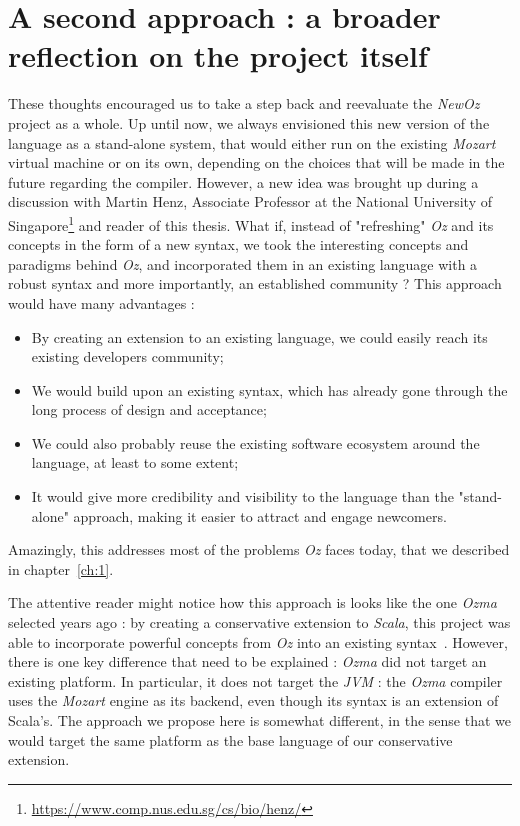 \section{A second approach : a broader reflection on the project itself}\label{sec:ch4-reflection}
These thoughts encouraged us to take a step back and reevaluate the \textit{NewOz} project as a whole.
Up until now, we always envisioned this new version of the language as a stand-alone system, that would either run on the existing \textit{Mozart} virtual machine or on its own, depending on the choices that will be made in the future regarding the compiler.
However, a new idea was brought up during a discussion with Martin Henz, Associate Professor at the National University of Singapore\footnote{\url{https://www.comp.nus.edu.sg/cs/bio/henz/}} and reader of this thesis.
What if, instead of "refreshing" \textit{Oz} and its concepts in the form of a new syntax, we took the interesting concepts and paradigms behind \textit{Oz}, and incorporated them in an existing language with a robust syntax and more importantly, an established community ?
This approach would have many advantages :
\begin{itemize}
    \item By creating an extension to an existing language, we could easily reach its existing developers community;
    \item We would build upon an existing syntax, which has already gone through the long process of design and acceptance;
    \item We could also probably reuse the existing software ecosystem around the language, at least to some extent;
    \item It would give more credibility and visibility to the language than the "stand-alone" approach, making it easier to attract and engage newcomers.
\end{itemize}
Amazingly, this addresses most of the problems \textit{Oz} faces today, that we described in chapter~\ref{ch:1}.\newline

The attentive reader might notice how this approach is looks like the one \textit{Ozma} selected years ago : by creating a conservative extension to \textit{Scala}, this project was able to incorporate powerful concepts from \textit{Oz} into an existing syntax~\cite{Ozma}.
However, there is one key difference that need to be explained : \textit{Ozma} did not target an existing platform.
In particular, it does not target the \textit{JVM} : the \textit{Ozma} compiler uses the \textit{Mozart} engine as its backend, even though its syntax is an extension of Scala's.
The approach we propose here is somewhat different, in the sense that we would target the same platform as the base language of our conservative extension.\newline

